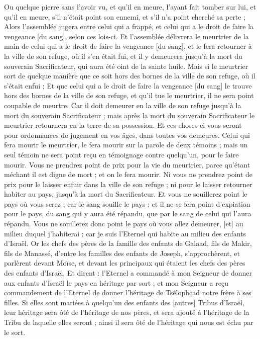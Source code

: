\begin{multicols}{2}
Ou quelque pierre sans l'avoir vu, et qu'il en meure, l'ayant fait tomber sur lui, et qu'il en meure, s'il n'était point son ennemi, et s'il n'a point cherché sa perte ;
Alors l'assemblée jugera entre celui qui a frappé, et celui qui a le droit de faire la vengeance [du sang], selon ces lois-ci.
Et l'assemblée délivrera le meurtrier de la main de celui qui a le droit de faire la vengeance [du sang], et le fera retourner à la ville de son refuge, où il s'en était fui, et il y demeurera jusqu'à la mort du souverain Sacrificateur, qui aura été oint de la sainte huile.
Mais si le meurtrier sort de quelque manière que ce soit hors des bornes de la ville de son refuge, où il s'était enfui ;
Et que celui qui a le droit de faire la vengeance [du sang] le trouve hors des bornes de la ville de son refuge, et qu'il tue le meurtrier, il ne sera point coupable de meurtre.
Car il doit demeurer en la ville de son refuge jusqu'à la mort du souverain Sacrificateur ; mais après la mort du souverain Sacrificateur le meurtrier retournera en la terre de sa possession.
Et ces choses-ci vous seront pour ordonnances de jugement en vos âges, dans toutes vos demeures.
Celui qui fera mourir le meurtrier, le fera mourir sur la parole de deux témoins ; mais un seul témoin ne sera point reçu en témoignage contre quelqu'un, pour le faire mourir.
Vous ne prendrez point de prix pour la vie du meurtrier, parce qu'étant méchant il est digne de mort ; et on le fera mourir.
Ni vous ne prendrez point de prix pour le laisser enfuir dans la ville de son refuge ; ni pour le laisser retourner habiter au pays, jusqu'à la mort du Sacrificateur.
Et vous ne souillerez point le pays où vous serez ; car le sang souille le pays ; et il ne se fera point d'expiation pour le pays, du sang qui y aura été répandu, que par le sang de celui qui l'aura répandu.
Vous ne souillerez donc point le pays où vous allez demeurer, [et] au milieu duquel j'habiterai ; car je suis l'Eternel qui habite au milieu des enfants d'Israël.
\VerseOne{}Or les chefs des pères de la famille des enfants de Galaad, fils de Makir, fils de Manassé, d'entre les familles des enfants de Joseph, s'approchèrent, et parlèrent devant Moïse, et devant les principaux qui étaient les chefs des pères des enfants d'Israël,
Et dirent : l'Eternel a commandé à mon Seigneur de donner aux enfants d'Israël le pays en héritage par sort ; et mon Seigneur a reçu commandement de l'Eternel de donner l'héritage de Tsélophcad notre frère à ses filles.
Si elles sont mariées à quelqu'un des enfants des [autres] Tribus d'Israël, leur héritage sera ôté de l'héritage de nos pères, et sera ajouté à l'héritage de la Tribu de laquelle elles seront ; ainsi il sera ôté de l'héritage qui nous est échu par le sort.

\end{multicols}
